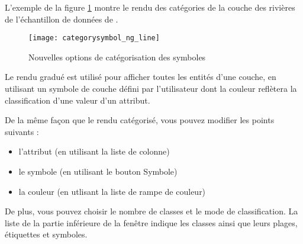 L'exemple de la figure \ref{fig:catsymNG} montre le rendu des catégories de la couche des rivières de l'échantillon de données de \qg.

\begin{figure}[ht]
   \centering
   \caption{Nouvelles options de catégorisation des symboles \nixcaption}\label{fig:catsymNG}
   \texttt{[image: categorysymbol\_ng\_line]}
\end{figure}


Le rendu gradué est utilisé pour afficher toutes les entités d'une couche, en utilisant un symbole de couche défini par l'utilisateur dont la couleur reflètera la classification d'une valeur d'un attribut.

De la même façon que le rendu catégorisé, vous pouvez modifier les points suivants :

\begin{itemize}[label=--]
\item l'attribut (en utilisant la liste de colonne)
\item le symbole (en utilisant le bouton Symbole)
\item la couleur (en utlisant la liste de rampe de couleur)
\end{itemize}

De plus, vous pouvez choisir le nombre de classes et le mode de classification. La liste de la partie inférieure de la fenêtre indique les classes ainsi que leurs plages, étiquettes et symboles.

